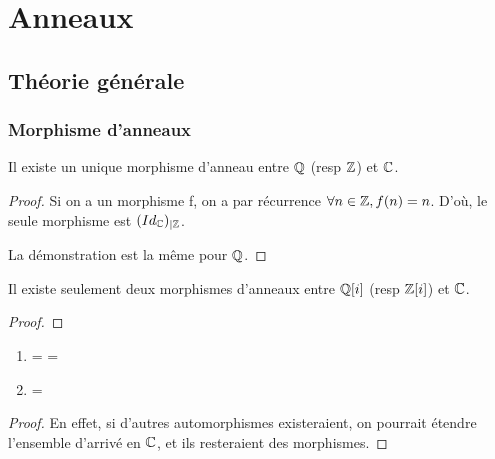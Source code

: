 \chapter{Anneaux}

\section{Théorie générale}

\subsection{Morphisme d'anneaux}
\begin{proposition}
	Il existe un unique morphisme d'anneau entre $\mathbb{Q}$ (resp $\mathbb{Z}$)
	et $\mathbb{C}$.
\end{proposition}

\begin{proof}
	Si on a un morphisme f, on a par récurrence $\forall n \in \mathbb{Z}, f(n) =
	n$. D'où, le seule morphisme est $({Id_{\mathbb{C}}})_{|\mathbb{Z}}$.

	La démonstration est la même pour $\mathbb{Q}$.
\end{proof}

\begin{proposition}
	Il existe seulement deux morphismes d'anneaux entre $\mathbb{Q}[i]$ (resp
	$\mathbb{Z}[i]$) et $\mathbb{C}$.
\end{proposition}

\begin{proof}

\end{proof}

\begin{corollary}
	\begin{enumerate}
		\item {} =
			 = 
		\item {} = 
	\end{enumerate}
\end{corollary}

\begin{proof}
	En effet, si d'autres automorphismes existeraient, on pourrait étendre
	l'ensemble d'arrivé en $\mathbb{C}$, et ils resteraient des morphismes.
\end{proof}

